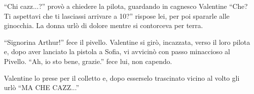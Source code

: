     ``Chi cazz...?'' provò a chiedere la pilota, guardando in cagnesco Valentine ``Che? Ti aspettavi che ti lasciassi
    arrivare a 10?'' rispose lei, per poi spararle alle ginocchia. La donna urlò di dolore mentre si contorceva per
    terra.

    ``Signorina Arthur!'' fece il pivello. Valentine si girò, incazzata, verso il loro pilota e, dopo aver lanciato la
    pistola a Sofia, vi avvicinò con passo minaccioso al Pivello. ``Ah, io sto bene, grazie.'' fece lui, non capendo.

    Valentine lo prese per il colletto e, dopo esserselo trascinato vicino al volto gli urlò ``MA CHE CAZZ...''

